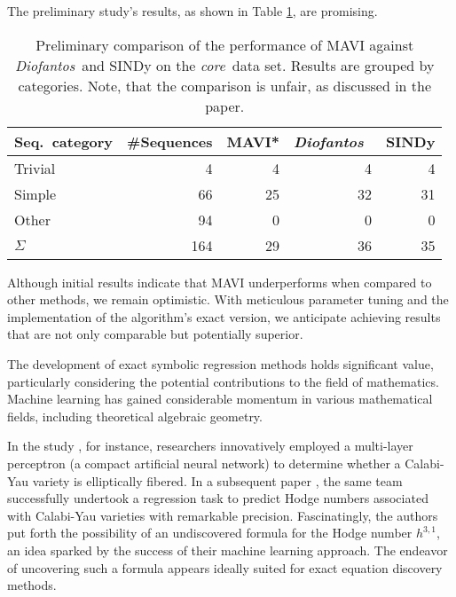 \documentclass[runningheads]{llncs}
\newcommand{\DP}{\textsl{Diofantos}}
\newcommand{\core}{\textsl{core}}  %
\begin{document}
The preliminary study’s results, as shown in Table \ref{tab}, are promising.



\begin{table}[h]
\caption{Preliminary comparison of the performance of MAVI against \DP\ and SINDy on the \core\ data set. Results are grouped by categories.
Note, that the comparison is unfair, as discussed in the paper.
}
\label{tab}
\begin{tabular}{l|rrrr}
Seq.~category \hspace*{0.5cm} & \#Sequences & \hspace*{0.15cm} MAVI*  & \DP\ & \hspace*{0.15cm} SINDy  \\
\hline
Trivial & 4   & 4  & 4    & 4    \\
Simple  & 66 & 25  & 32  & 31     \\
Other   & 94  & 0  & 0    & 0      \\
\hline
\textbf{$\Sigma$}  & 164 & 29 & 36   & 35 
\end{tabular} 
\end{table}


Although initial results indicate that MAVI underperforms when compared to 
other methods, we remain optimistic. 
With meticulous parameter tuning and the implementation of the algorithm’s exact 
version, we anticipate achieving results that are not only comparable but potentially superior.

The development of exact symbolic regression methods holds significant value, particularly considering the potential contributions to the field of mathematics. Machine learning has gained considerable momentum in various mathematical fields, including theoretical algebraic geometry.

In the study \cite{Calabi-fibrations}, for instance, researchers innovatively employed a multi-layer perceptron (a compact artificial neural network) to determine whether a Calabi-Yau variety is elliptically fibered. In a subsequent paper \cite{Calabi-4-folds}, the same team successfully undertook a regression task to predict Hodge numbers associated with Calabi-Yau varieties with remarkable precision. 
Fascinatingly, the authors put forth the possibility of an undiscovered formula for the Hodge number $h^{3,1}$, an idea sparked by the success of their machine learning 
approach.
The endeavor of uncovering such a formula
appears ideally suited for 
exact equation discovery methods.
\end{document}
